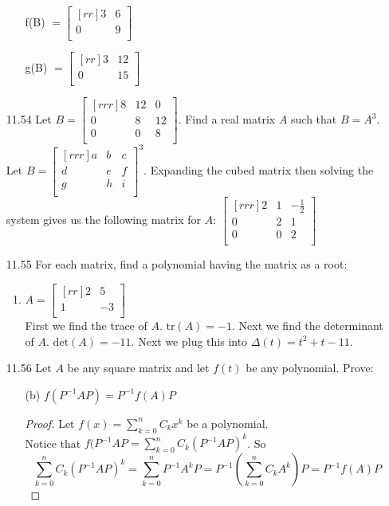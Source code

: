 \documentclass[12pt]{article}
\theoremstyle{definition}
\theoremstyle{plain}
\begin{document}
\begin{enumerate}
\begin{enumerate}
	\item[f(B)]$=\begin{bmatrix}[rr]3&6\\0&9\\\end{bmatrix}$
	\item[g(B)]$=\begin{bmatrix}[rr]3&12\\0&15\\\end{bmatrix}$
	\end{enumerate}
\item[11.54]Let $B=\begin{bmatrix}[rrr]8&12&0\\0&8&12\\0&0&8\\\end{bmatrix}$. Find a real matrix $A$ such that $B=A^3$.\\
	Let $B = \begin{bmatrix}[rrr]a&b&c\\d&e&f\\g&h&i\\\end{bmatrix}^3$.
	Expanding the cubed matrix then solving the system gives us the following matrix for $A$: $\begin{bmatrix}[rrr]2&1&-\frac{1}{2}\\0&2&1\\0&0&2\\\end{bmatrix}$

\item[11.55]For each matrix, find a polynomial having the matrix as a root:
	\begin{enumerate}
	\item $A=\begin{bmatrix}[rr]2&5\\1&-3\\\end{bmatrix}$\\
	First we find the trace of $A$. $\mathrm{tr}(A)=-1$. Next we find the determinant of $A$. $\mathrm{det}(A)=-11$. Next we plug this into $\Delta (t) = t^2+t-11$.
	\end{enumerate}
	
\item[11.56]Let $A$ be any square matrix and let $f(t)$ be any polynomial. Prove:
	\begin{enumerate}
	\item[(b)] $f(P^{-1}AP)=P^{-1}f(A)P$
	\begin{proof}
	Let $f(x)=\sum_{k=0}^nC_kx^k$ be a polynomial.\\
	Notice that $f(P^{-1}AP=\sum_{k=0}^nC_k(P^{-1}AP)^k$. So
	\[ \sum_{k=0}^nC_k(P^{-1}AP)^k=\sum_{k=0}^nP^{-1}A^kP=P^{-1}(\sum_{k=0}^nC_kA^k)P=P^{-1}f(A)P \]
	\end{proof}
	\end{enumerate}
			

\end{enumerate}
\end{document}
